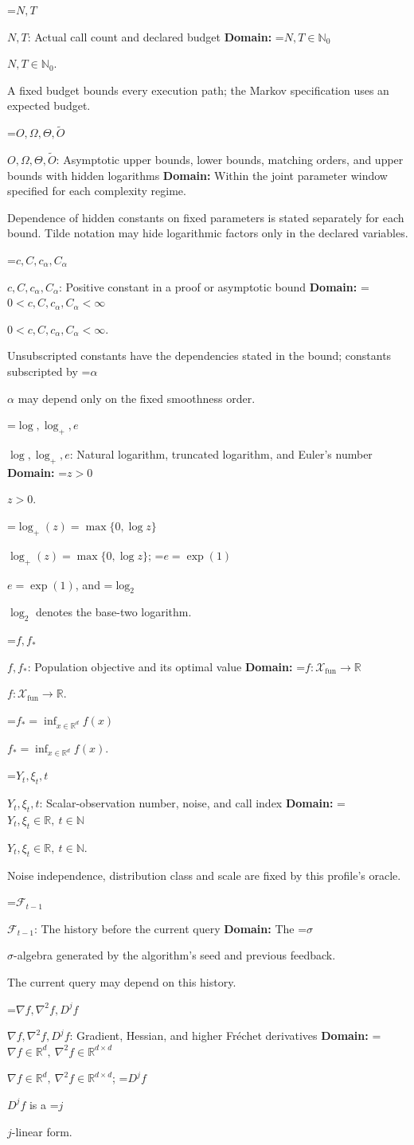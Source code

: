 \documentclass[10pt,a4paper]{article}
\newcommand{\AtlasMath}[1]{\par\begingroup\centering\setbox0=\hbox{$\displaystyle #1$}\ifdim\wd0>1.4\linewidth\typeout{ATLAS WIDE FORMULA: \the\wd0}\fi\ifdim\wd0>\linewidth\resizebox{\linewidth}{!}{\box0}\else\box0\fi\par\endgroup}
\newcommand{\AtlasInlineMath}[1]{\begingroup\setbox0=\hbox{$#1$}\ifdim\wd0>.4\linewidth\endgroup\AtlasMath{#1}\else\endgroup$#1$\fi}
\begin{document}
\AtlasInlineMath{N,T}: Actual call count and declared budget \textbf{Domain:} \AtlasInlineMath{N,T\in\mathbb{N}_0}.

A fixed budget bounds every execution path; the Markov specification uses an expected budget.

\AtlasInlineMath{O,\Omega,\Theta,\widetilde{O}}: Asymptotic upper bounds, lower bounds, matching orders, and upper bounds with hidden logarithms \textbf{Domain:} Within the joint parameter window specified for each complexity regime.

Dependence of hidden constants on fixed parameters is stated separately for each bound. Tilde notation may hide logarithmic factors only in the declared variables.

\AtlasInlineMath{c,C,c_\alpha,C_\alpha}: Positive constant in a proof or asymptotic bound \textbf{Domain:} \AtlasInlineMath{0<c,C,c_\alpha,C_\alpha<\infty}.

Unsubscripted constants have the dependencies stated in the bound; constants subscripted by \AtlasInlineMath{\alpha} may depend only on the fixed smoothness order.

\AtlasInlineMath{\log,\log_+,e}: Natural logarithm, truncated logarithm, and Euler's number \textbf{Domain:} \AtlasInlineMath{z>0}.

\AtlasInlineMath{\log_+(z)=\max\{0,\log z\}}; \AtlasInlineMath{e=\exp(1)}, and \AtlasInlineMath{\log_2} denotes the base-two logarithm.

\AtlasInlineMath{f,f_*}: Population objective and its optimal value \textbf{Domain:} \AtlasInlineMath{f:\mathcal{X}_{\mathrm{fun}}\to\mathbb{R}}.

\AtlasInlineMath{f_*=\inf_{x\in \mathbb{R}^d}f(x)}.

\AtlasInlineMath{Y_t,\xi_t,t}: Scalar-observation number, noise, and call index \textbf{Domain:} \AtlasInlineMath{Y_t,\xi_t\in\mathbb{R},\ t\in\mathbb{N}}.

Noise independence, distribution class and scale are fixed by this profile's oracle.

\AtlasInlineMath{\mathcal{F}_{t-1}}: The history before the current query \textbf{Domain:} The \AtlasInlineMath{\sigma}-algebra generated by the algorithm's seed and previous feedback.

The current query may depend on this history.

\AtlasInlineMath{\nabla f,\nabla^2f,D^jf}: Gradient, Hessian, and higher Fréchet derivatives \textbf{Domain:} \AtlasInlineMath{\nabla f\in\mathbb{R}^d,\ \nabla^2f\in\mathbb{R}^{d\times d}}; \AtlasInlineMath{D^jf} is a \AtlasInlineMath{j}-linear form.
\end{document}
